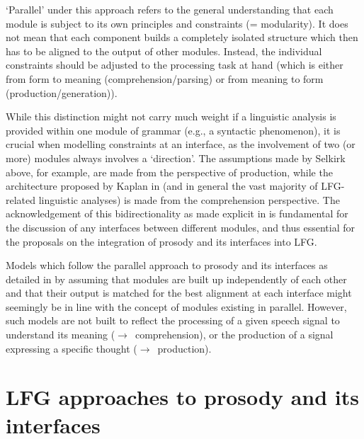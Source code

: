 \documentclass[output=paper,hidelinks]{langscibook}
\begin{document}
\noindent `Parallel' under this approach refers to the general understanding that each module is subject to its own principles and constraints (= modularity). It does not mean that each component builds a completely isolated structure which then has to be aligned to the output of other modules. Instead, the individual constraints should be adjusted to the processing task at hand (which is either from {\sc form} to {\sc meaning} (comprehension/parsing) or from {\sc meaning} to {\sc form} (production/generation)). 

While this distinction might not carry much weight if a linguistic analysis is provided within one module of grammar (e.g., a syntactic phenomenon), it is crucial when modelling constraints at an interface, as the involvement of two (or more) modules always involves a `direction'. The assumptions made by Selkirk above, for example, are made from the perspective of production, while the architecture proposed by Kaplan in  (and in general the vast majority of LFG-related linguistic analyses) is made from the comprehension perspective. The acknowledgement of this bidirectionality as made explicit in  is fundamental for the discussion of any interfaces between different modules, and thus essential for the proposals on the integration of prosody and its interfaces into LFG.


Models which follow the parallel approach to prosody and its interfaces as detailed in  by assuming that modules are built up independently of each other and that their output is matched for the best alignment at each interface might seemingly be in line with the concept of modules existing in parallel. However, such models are not built to reflect the processing of a given speech signal to understand its meaning ($\rightarrow$\ comprehension), or the production of a signal expressing a specific thought ($\rightarrow$\ production).



%
\section{LFG approaches to prosody and its interfaces}
\label{sec:ps_LFG}
\end{document}
